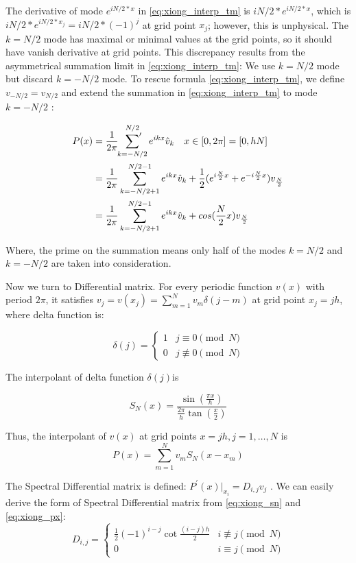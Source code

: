 The derivative of mode $e^{iN/2*x}$ in \eqref{eq:xiong_interp_tm} is $iN/2*e^{iN/2*x}$,
which is $iN/2*e^{iN/2*x_{j}}=iN/2*(-1)^{j}$ at grid point $x_{j}$; however, this is
unphysical. The $k=N/2$ mode has maximal or minimal values at
the grid points, so it should have vanish derivative at grid points. This discrepancy
results from the asymmetrical summation limit in \eqref{eq:xiong_interp_tm}:
We use $k=N/2$ mode but discard $k=-N/2$ mode. To rescue formula
\eqref{eq:xiong_interp_tm}, we define $v_{-N/2}=v_{N/2}$ and extend the summation in
\eqref{eq:xiong_interp_tm} to mode $k=-N/2$ :

\begin{align}
\label{eq:xiong_interp}
 P(x)&=\frac{1}{2\pi}\sideset{}{'}\sum_{k=-N/2}^{N/2}e^{ikx}\hat{v}_{k} \quad
 x\in [0,2\pi]=[0,hN]  \\
 &=\frac{1}{2\pi}\sum_{k=-N/2+1}^{N/2-1}e^{ikx}\hat{v}_{k}+\frac{1}{2}
 (e^{i\frac{N}{2}x}+e^{-i\frac{N}{2}x})v_{\frac{N}{2}} \nonumber\\
 &=\frac{1}{2\pi}\sum_{k=-N/2+1}^{N/2-1}e^{ikx}\hat{v}_{k}+
 cos(\frac{N}{2}x)v_{\frac{N}{2}} \nonumber
\end{align}

Where, the prime on the summation means only half of the modes
$k=N/2$ and $k=-N/2$ are taken into consideration.

Now we turn to Differential matrix. For every periodic function $v(x)$
with period $2\pi$, it satisfies
$v_{j}=v(x_{j})=\sum_{m=1}^{N}v_{m}\delta (j-m)$ at
 grid point $x_{j}=jh$, where delta function is:

 \[
 \delta(j) =
  \begin{cases}
   1 & j\equiv 0 \pmod N \\
   0 & j\not\equiv 0 \pmod N
  \end{cases}
\]

The interpolant of delta function $\delta (j)$is

\begin{equation}
\label{eq:xiong_sn}
 S_{N}(x)=\frac{\sin (\frac{\pi x}{h})}{\frac{2\pi}{h}\tan (\frac{x}{2})}
\end{equation}

Thus, the interpolant of $v(x)$ at grid points ${x=jh,j=1,\dots ,N}$ is
\begin{equation}
\label{eq:xiong_px}
 P(x)=\sum_{m=1}^{N}v_{m}S_{N}(x-x_{m})
\end{equation}

The Spectral Differential matrix is defined:
$P^{'}(x)|_{x_{i}}=D_{i,j}v_{j}$ .
We can easily derive the form of Spectral Differential matrix from
\eqref{eq:xiong_sn} and \eqref{eq:xiong_px}:
\[
 D_{i,j}=
	 \begin{cases}
          \frac{1}{2}(-1)^{i-j}\cot \frac{(i-j)h}{2} & i\not\equiv j \pmod N  \\
          0 & i\equiv j \pmod N
         \end{cases}
\]


